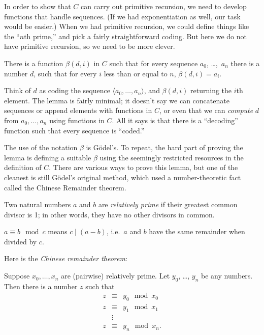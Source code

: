 \documentclass[../../include/open-logic-section]{subfiles}
\begin{document}


In order to show that $C$ can carry out primitive recursion, we need
to develop functions that handle sequences. (If we had exponentiation
as well, our task would be easier.) When we had primitive recursion,
we could define things like the ``$n$th prime,'' and pick a fairly
straightforward coding. But here we do not have primitive recursion,
so we need to be more clever.

\begin{lem}
There is a function $\beta(d,i)$ in $C$ such that for every sequence
$a_0$, \dots,~$a_n$ there is a number $d$, such that for every $i$ less
than or equal to $n$, $\beta(d,i) = a_i$.
\end{lem}

Think of $d$ as coding the sequence $\langle a_0,\dots,a_n \rangle$, and
$\beta(d,i)$ returning the $i$th element. The lemma is fairly minimal;
it doesn't say we can concatenate sequences or append elements with
functions in $C$, or even that we can \emph{compute} $d$ from
$a_0,\dots,a_n$ using functions in $C$. All it says is that there is
a ``decoding'' function such that every sequence is ``coded.''

The use of the notation $\beta$ is G\"odel's. To repeat, the hard part
of proving the lemma is defining a suitable $\beta$ using the
seemingly restricted resources in the definition of $C$. There are
various ways to prove this lemma, but one of the cleanest is still
G\"odel's original method, which used a number-theoretic fact called
the Chinese Remainder theorem.

\begin{defn}
  Two natural numbers $a$ and $b$ are \emph{relatively prime} if their
  greatest common divisor is 1; in other words, they have no other
  divisors in common.
\end{defn}

\begin{defn}
$a \equiv b \mod c$ means $c \mid (a-b)$, i.e.\ $a$ and $b$ have the
same remainder when divided by $c$.
\end{defn}

Here is the \emph{Chinese remainder theorem}:
\begin{thm}
Suppose $x_0,\dots,x_n$ are (pairwise) relatively prime. Let
$y_0$, \dots, $y_n$ be any numbers. Then there is a number $z$ such that
\begin{eqnarray*}
z & \equiv & y_0 \mod x_0 \\
z & \equiv & y_1 \mod x_1 \\
& \vdots & \\
z & \equiv & y_n \mod x_n.
\end{eqnarray*}
\end{thm}
\end{document}
